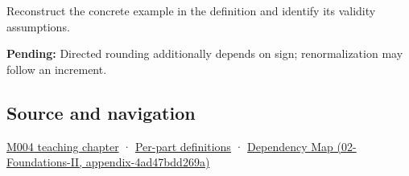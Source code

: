 Reconstruct the concrete example in the definition and identify its validity assumptions.

\textbf{Pending:} Directed rounding additionally depends on sign; renormalization may follow an increment.

\subsection{Source and navigation}\label{appendix-b572b631069b-source-and-navigation}

\hyperref[01-foundations-i-ch001-a-stretching-ruler-for-real-valued-quantities]{M004 teaching chapter} · \hyperref[appendix-fd090d982a15-m004---parts-61-76]{Per-part definitions} · \href{../02-Foundations-II/main.pdf\#nameddest=appendix-4ad47bdd269a}{Dependency Map (02-Foundations-II, appendix-4ad47bdd269a)}
